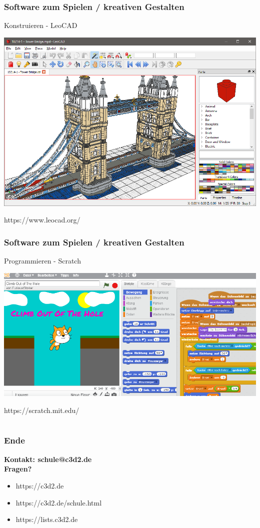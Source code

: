 \documentclass[12pt]{beamer}
\begin{document}
\begin{frame}
	\frametitle{Software zum Spielen / kreativen Gestalten}
	Konstruieren - LeoCAD 
	\begin{center}
		\includegraphics[height=0.6\textheight]{img/towerbridge.png}
	\end{center}
	https://www.leocad.org/
\end{frame}

\begin{frame}
	\frametitle{Software zum Spielen / kreativen Gestalten}
	Programmieren - Scratch
	\begin{center}
		\includegraphics[height=0.6\textheight]{img/scratch.png}
	\end{center}
	https://scratch.mit.edu/
\end{frame}


\section*{}
\subsection*{}

\begin{frame}
	\frametitle{Ende}
	\begin{center}
		\textbf{Kontakt: schule@c3d2.de} \\
		\textbf{Fragen?} 
	\end{center}
	\begin{itemize}
		\item<1-> https://c3d2.de
		\item<2-> https://c3d2.de/schule.html
		\item<3-> https://lists.c3d2.de
	\end{itemize}
\end{frame}
\end{document}
